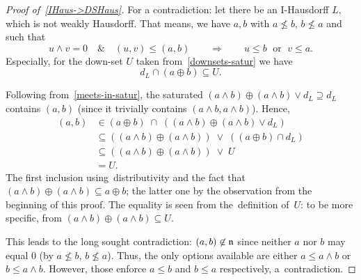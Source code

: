 \begin{proof}[Proof of~\ref{IHaus->DSHaus}]
  For a contradiction: let there be an I-Hausdorff $L$, which is not weakly
  Hausdorff.
  That means, we have $a, b$ with $a \not\leq b, \, b \not\leq a$ and such that
  \[
    u \wedge v = 0 \quad \& \quad \left(u, v\right) \leq \left(a, b\right)
    \qquad \Longrightarrow \qquad
    u \leq b \; \textrm{ or } \; v \leq a.
  \]
  Especially, for the down-set $U$ taken from~\ref{downsets-satur} we have
  \[
    d_L \cap (a \oplus b) \subseteq U.
  \]

  Following from~\ref{meets-in-satur}\thinspace, the saturated $\left(a \wedge
  b\right) \oplus \left(a \wedge b\right) \vee d_L \supseteq d_L$ contains $(a,
  b)$ (since it trivially contains $\left( a \wedge b, a \wedge b \right)$).
  Hence,
  \begin{align*}
    (a, b) &\in (a \oplus b) \; \cap \; ((a \wedge b) \oplus (a \wedge b) \vee d_L) \\
           &\subseteq ((a \wedge b) \oplus (a \wedge b)) \; \vee \; ((a \oplus b) \cap d_L) \\
           &\subseteq ((a \wedge b) \oplus (a \wedge b)) \; \vee \; U \\
           &= U.
  \end{align*}
  The first inclusion using~distributivity and the fact that $(a \wedge b)
  \oplus (a \wedge b) \subseteq a \oplus b$;
  the latter one by the observation from the beginning of this proof.
  The equality is seen from the~definition of~$U$:
  to be more specific, from $(a \wedge b) \oplus (a \wedge b) \subseteq U$.

  This leads to the long sought contradiction:
  $(a, b)\not\in \mathfrak{n}$ since neither $a$ nor $b$ may equal $0$ (by $a \not\leq b,
  \, b \not\leq a$).
  Thus, the only options available are either $a \leq a \wedge b$ or $b \leq a
  \wedge b$.
  However, those enforce $a \leq b$ and $b \leq a$ respectively,
  a~contradiction. 
\end{proof}
